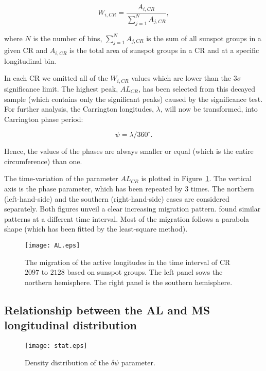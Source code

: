 \begin{equation}
W_{i,CR} = \frac{A_{i,CR}}{ \sum_{j=1}^{N} A_{j,CR} },
\end{equation}

where $N$ is the number of bins, $\sum_{j=1}^{N} A_{j,CR}$  is the sum of all sunspot groups in a given CR and $A_{i,CR}$ is the  total area of sunspot groups in a CR and at a specific longitudinal bin.

In each CR we omitted all of the $ W_{i,CR}$ values which are lower than the $3\sigma$ significance limit. The highest peak, $AL_{CR}$, has been selected from this decayed sample (which contains only the significant peaks) caused by the significance test. For further analysis, the Carrington longitudes, $\lambda$, will now be transformed, into Carrington phase period: 

\begin{equation}
\psi = \lambda/360^{\circ}.
\end{equation}

Hence, the values of the phases are always smaller or equal (which is the entire circumference) than one. 

The time-variation of the parameter $AL_{CR}$ is plotted in Figure~\ref{AL}. The vertical axis is the phase parameter, which has been repeated by $3$ times.
The northern (left-hand-side) and the southern (right-hand-side) cases are considered separately. Both figures unveil a clear increasing migration pattern. \cite{Usoskin,Gyenge2014} found similar patterns at a different time interval. Most of the migration follows a parabola shape (which has been fitted by the least-square method).

\begin{figure}
	\centering
	\texttt{[image: AL.eps]}
	\caption{The migration of the active longitudes in the time interval of CR $2097$ to $2128$ based on sunspot groups. The left panel sows the northern hemisphere. The right panel is the southern hemisphere.}
	\label{AL}
\end{figure}

\subsection{Relationship between the AL and MS longitudinal distribution}

\begin{figure}
	{\texttt{[image: stat.eps]}}
	{\caption{Density distribution of the $\delta\psi$ parameter. }\label{stat}}
\end{figure}	

